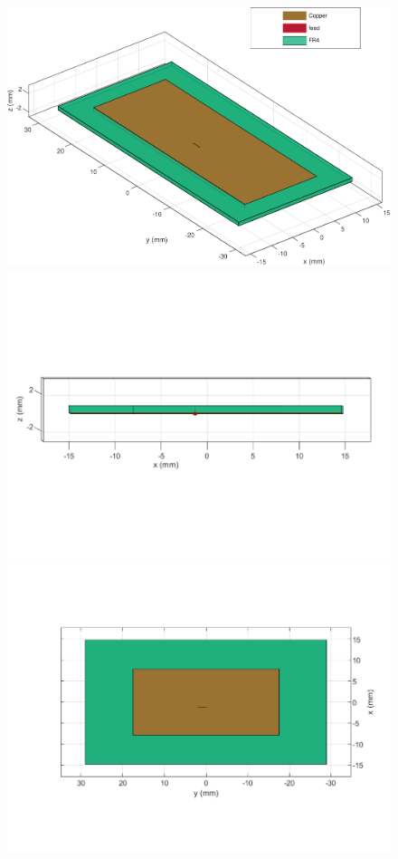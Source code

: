 \documentclass[12pt,a4paper]{article}
\begin{document}
{\begin{figure}[h]
\begin{center}
\includegraphics[scale=0.35]{patch_structure.pdf}
\includegraphics[scale=0.35]{patch_structure_2.pdf}
\includegraphics[scale=0.35]{patch_structure_3.pdf}

\end{center}
\end{figure}}
\end{document}
